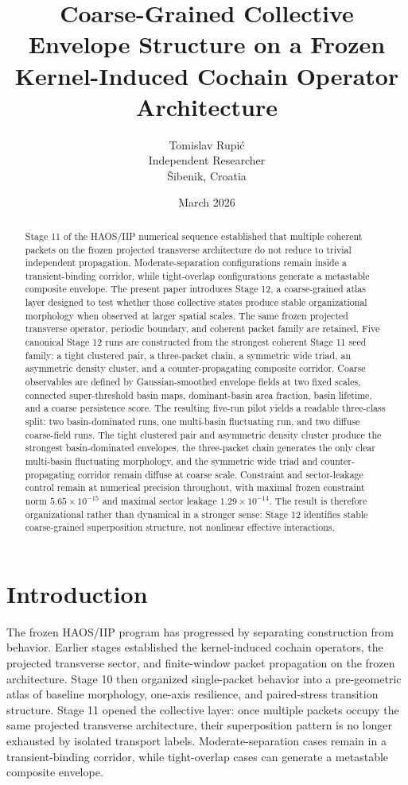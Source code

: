 \documentclass[11pt]{article}
\title{Coarse-Grained Collective Envelope Structure on a Frozen Kernel-Induced Cochain Operator Architecture}
\author{Tomislav Rupi\'c\\Independent Researcher\\\v{S}ibenik, Croatia}
\date{March 2026}
\begin{document}
\maketitle

\begin{abstract}
Stage 11 of the HAOS/IIP numerical sequence established that multiple coherent packets on the frozen projected transverse architecture do not reduce to trivial independent propagation. Moderate-separation configurations remain inside a transient-binding corridor, while tight-overlap configurations generate a metastable composite envelope. The present paper introduces Stage 12, a coarse-grained atlas layer designed to test whether those collective states produce stable organizational morphology when observed at larger spatial scales. The same frozen projected transverse operator, periodic boundary, and coherent packet family are retained. Five canonical Stage 12 runs are constructed from the strongest coherent Stage 11 seed family: a tight clustered pair, a three-packet chain, a symmetric wide triad, an asymmetric density cluster, and a counter-propagating composite corridor. Coarse observables are defined by Gaussian-smoothed envelope fields at two fixed scales, connected super-threshold basin maps, dominant-basin area fraction, basin lifetime, and a coarse persistence score. The resulting five-run pilot yields a readable three-class split: two basin-dominated runs, one multi-basin fluctuating run, and two diffuse coarse-field runs. The tight clustered pair and asymmetric density cluster produce the strongest basin-dominated envelopes, the three-packet chain generates the only clear multi-basin fluctuating morphology, and the symmetric wide triad and counter-propagating corridor remain diffuse at coarse scale. Constraint and sector-leakage control remain at numerical precision throughout, with maximal frozen constraint norm $5.65\times 10^{-15}$ and maximal sector leakage $1.29\times 10^{-14}$. The result is therefore organizational rather than dynamical in a stronger sense: Stage 12 identifies stable coarse-grained superposition structure, not nonlinear effective interactions.
\end{abstract}

\section{Introduction}
The frozen HAOS/IIP program has progressed by separating construction from behavior. Earlier stages established the kernel-induced cochain operators, the projected transverse sector, and finite-window packet propagation on the frozen architecture. Stage 10 then organized single-packet behavior into a pre-geometric atlas of baseline morphology, one-axis resilience, and paired-stress transition structure. Stage 11 opened the collective layer: once multiple packets occupy the same projected transverse architecture, their superposition pattern is no longer exhausted by isolated transport labels. Moderate-separation cases remain in a transient-binding corridor, while tight-overlap cases can generate a metastable composite envelope.
\end{document}
